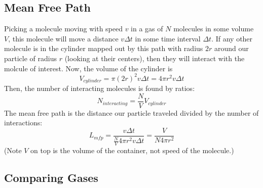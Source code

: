 \documentclass{article}
\begin{document}
\subsection{Mean Free Path}

Picking a molecule moving with speed $v$ in a gas of $N$ molecules in some volume $V$, this molecule will move a distance $v\Delta t$ in some time interval $\Delta t$. If any other molecule is in the cylinder mapped out by this path with radius $2r$ around our particle of radius $r$ (looking at their centers), then they will interact with the molcule of interest. Now, the volume of the cylinder is
\begin{equation}
V_{cylinder} = \pi (2r)^2v\Delta t = 4\pi r^2v\Delta t
\end{equation}
Then, the number of interacting molecules is found by ratios:
\begin{equation}
N_{interacting} = \frac{N}{V} V_{cylinder}
\end{equation}
The mean free path is the distance our particle traveled divided by the number of interactions:
\begin{equation}
L_{mfp} = \frac{v\Delta t}{\frac{N}{V} 4\pi r^2 v\Delta t} = \frac{V}{N 4\pi r^2}
\end{equation}
(Note $V$ on top is the volume of the container, not speed of the molecule.)

\subsection{Comparing Gases}
\end{document}
